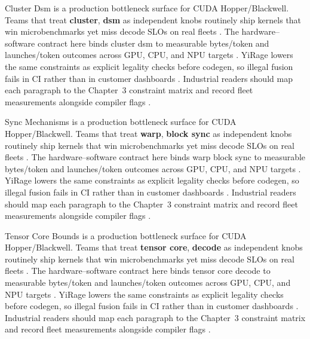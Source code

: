 Cluster Dsm is a production bottleneck surface for CUDA Hopper/Blackwell. Teams that treat \textbf{cluster}, \textbf{dsm} as independent knobs routinely ship kernels that win microbenchmarks yet miss decode SLOs on real fleets \citep{nvidia2024cudagraphs,taxbreak2026}. The hardware--software contract here binds cluster dsm to measurable bytes/token and launches/token outcomes across GPU, CPU, and NPU targets \citep{liu2024deepseekv3,memoryfloor2026}. YiRage lowers the same constraints as explicit legality checks before codegen, so illegal fusion fails in CI rather than in customer dashboards \citep{patel2025llminference,nvidia2022hopper}. Industrial readers should map each paragraph to the Chapter~3 constraint matrix and record fleet measurements alongside compiler flags \citep{taxbreak2026,semianalysis2024tma}.

Sync Mechanisms is a production bottleneck surface for CUDA Hopper/Blackwell. Teams that treat \textbf{warp}, \textbf{block sync} as independent knobs routinely ship kernels that win microbenchmarks yet miss decode SLOs on real fleets \citep{liu2024deepseekv3,memoryfloor2026}. The hardware--software contract here binds warp block sync to measurable bytes/token and launches/token outcomes across GPU, CPU, and NPU targets \citep{patel2025llminference,nvidia2022hopper}. YiRage lowers the same constraints as explicit legality checks before codegen, so illegal fusion fails in CI rather than in customer dashboards \citep{taxbreak2026,semianalysis2024tma}. Industrial readers should map each paragraph to the Chapter~3 constraint matrix and record fleet measurements alongside compiler flags \citep{memoryfloor2026,amd2024xdna}.

Tensor Core Bounds is a production bottleneck surface for CUDA Hopper/Blackwell. Teams that treat \textbf{tensor core}, \textbf{decode} as independent knobs routinely ship kernels that win microbenchmarks yet miss decode SLOs on real fleets \citep{patel2025llminference,nvidia2022hopper}. The hardware--software contract here binds tensor core decode to measurable bytes/token and launches/token outcomes across GPU, CPU, and NPU targets \citep{taxbreak2026,semianalysis2024tma}. YiRage lowers the same constraints as explicit legality checks before codegen, so illegal fusion fails in CI rather than in customer dashboards \citep{memoryfloor2026,amd2024xdna}. Industrial readers should map each paragraph to the Chapter~3 constraint matrix and record fleet measurements alongside compiler flags \citep{nvidia2022hopper,amd2024aie}.

